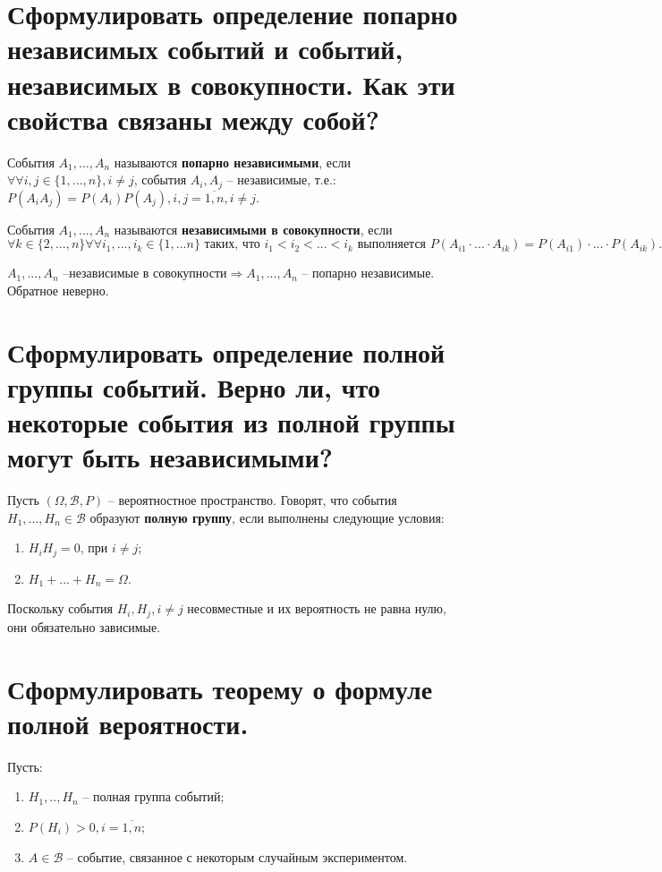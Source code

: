 \section{Сформулировать определение попарно независимых событий и событий, независимых в совокупности. Как эти свойства связаны между собой?}

События $A_1, ..., A_n$ называются \textbf{попарно независимыми}, если $\forall \forall i, j \in \{1, ..., n\}, i \neq j$, события $A_i, A_j$ -- независимые, т.е.: $P(A_iA_j) = P(A_i)P(A_j), i, j = \overline{1, n}, i \neq j.$

События $A_1, ..., A_n$ называются \textbf{независимыми в совокупности}, если $\forall k \in \{2, ..., n\} \forall \forall i_1, ..., i_k \in \{1, ... n\} \text{ таких, что } i_1 < i_2 < ... < i_k \text{ выполняется } P(A_{i1} \cdot ... \cdot A_{ik}) = P(A_{i1}) \cdot ... \cdot P(A_{ik}).$

$A_1, ..., A_n \text{ --независимые в совокупности} \Rightarrow A_1, ..., A_n \text{ -- попарно независимые}$. Обратное неверно.

\section{Сформулировать определение полной группы событий. Верно ли, что некоторые события из полной группы могут быть независимыми?}

Пусть $(\Omega, \mathcal{B}, P)$ -- вероятностное пространство. Говорят, что события $H_1, ..., H_n \in \mathcal{B}$ образуют \textbf{полную группу}, если выполнены следующие условия:
\begin{enumerate}
	\item $H_iH_j = 0$, при $i \neq j$;
	\item $H_1 + ... + H_n = \Omega$.
\end{enumerate}

Поскольку события $H_i, H_j, i \neq j$ несовместные и их вероятность не равна нулю, они обязательно зависимые.

\section{Сформулировать теорему о формуле полной вероятности.}

Пусть:
\begin{enumerate}
	\item $H_1, .., H_n$ -- полная группа событий;
	\item $P(H_i) > 0, i = \overline{1, n}$;
	\item $A \in \mathcal{B}$ -- событие, связанное с некоторым случайным экспериментом.
\end{enumerate}

